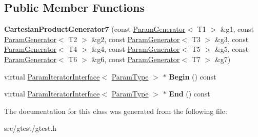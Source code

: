 \subsection*{Public Member Functions}
\begin{DoxyCompactItemize}
\item 
\mbox{\label{classtesting_1_1internal_1_1_cartesian_product_generator7_aafc9c559223d3a685028ec98aa727818}} 
{\bfseries Cartesian\+Product\+Generator7} (const \mbox{\hyperlink{classtesting_1_1internal_1_1_param_generator}{Param\+Generator}}$<$ T1 $>$ \&g1, const \mbox{\hyperlink{classtesting_1_1internal_1_1_param_generator}{Param\+Generator}}$<$ T2 $>$ \&g2, const \mbox{\hyperlink{classtesting_1_1internal_1_1_param_generator}{Param\+Generator}}$<$ T3 $>$ \&g3, const \mbox{\hyperlink{classtesting_1_1internal_1_1_param_generator}{Param\+Generator}}$<$ T4 $>$ \&g4, const \mbox{\hyperlink{classtesting_1_1internal_1_1_param_generator}{Param\+Generator}}$<$ T5 $>$ \&g5, const \mbox{\hyperlink{classtesting_1_1internal_1_1_param_generator}{Param\+Generator}}$<$ T6 $>$ \&g6, const \mbox{\hyperlink{classtesting_1_1internal_1_1_param_generator}{Param\+Generator}}$<$ T7 $>$ \&g7)
\item 
\mbox{\label{classtesting_1_1internal_1_1_cartesian_product_generator7_a081bf497e1a171f64ea6913356c6a999}} 
virtual \mbox{\hyperlink{classtesting_1_1internal_1_1_param_iterator_interface}{Param\+Iterator\+Interface}}$<$ \mbox{\hyperlink{classstd_1_1tr1_1_1tuple}{Param\+Type}} $>$ $\ast$ {\bfseries Begin} () const
\item 
\mbox{\label{classtesting_1_1internal_1_1_cartesian_product_generator7_a6d649474fc8829ec9eec412c6be13c83}} 
virtual \mbox{\hyperlink{classtesting_1_1internal_1_1_param_iterator_interface}{Param\+Iterator\+Interface}}$<$ \mbox{\hyperlink{classstd_1_1tr1_1_1tuple}{Param\+Type}} $>$ $\ast$ {\bfseries End} () const
\end{DoxyCompactItemize}


The documentation for this class was generated from the following file\+:\begin{DoxyCompactItemize}
\item 
src/gtest/gtest.\+h\end{DoxyCompactItemize}
